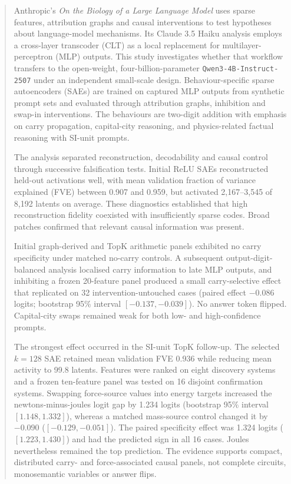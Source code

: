 \documentclass[11pt,a4paper]{article}
\newcommand{\model}{\texttt{Qwen3-4B-Instruct-2507}\xspace}
\begin{document}
\begin{abstract}
    Anthropic's \emph{On the Biology of a Large Language Model} uses sparse features, attribution graphs and causal interventions to test hypotheses about language-model mechanisms. Its Claude 3.5 Haiku analysis employs a cross-layer transcoder (CLT) as a local replacement for multilayer-perceptron (MLP) outputs. This study investigates whether that workflow transfers to the open-weight, four-billion-parameter \model under an independent small-scale design. Behaviour-specific sparse autoencoders (SAEs) are trained on captured MLP outputs from synthetic prompt sets and evaluated through attribution graphs, inhibition and swap-in interventions. The behaviours are two-digit addition with emphasis on carry propagation, capital-city reasoning, and physics-related factual reasoning with SI-unit prompts.

    The analysis separated reconstruction, decodability and causal control through successive falsification tests. Initial ReLU SAEs reconstructed held-out activations well, with mean validation fraction of variance explained (FVE) between 0.907 and 0.959, but activated 2,167--3,545 of 8,192 latents on average. These diagnostics established that high reconstruction fidelity coexisted with insufficiently sparse codes. Broad patches confirmed that relevant causal information was present.

    Initial graph-derived and TopK arithmetic panels exhibited no carry specificity under matched no-carry controls. A subsequent output-digit-balanced analysis localised carry information to late MLP outputs, and inhibiting a frozen 20-feature panel produced a small carry-selective effect that replicated on 32 intervention-untouched cases (paired effect $-0.086$ logits; bootstrap 95\% interval $[-0.137,-0.039]$). No answer token flipped. Capital-city swaps remained weak for both low- and high-confidence prompts.

    The strongest effect occurred in the SI-unit TopK follow-up. The selected $k=128$ SAE retained mean validation FVE 0.936 while reducing mean activity to 99.8 latents. Features were ranked on eight discovery systems and a frozen ten-feature panel was tested on 16 disjoint confirmation systems. Swapping force-source values into energy targets increased the newtons-minus-joules logit gap by 1.234 logits (bootstrap 95\% interval $[1.148,1.332]$), whereas a matched mass-source control changed it by $-0.090$ ($[-0.129,-0.051]$). The paired specificity effect was 1.324 logits ($[1.223,1.430]$) and had the predicted sign in all 16 cases. Joules nevertheless remained the top prediction. The evidence supports compact, distributed carry- and force-associated causal panels, not complete circuits, monosemantic variables or answer flips.
\end{abstract}
\end{document}
